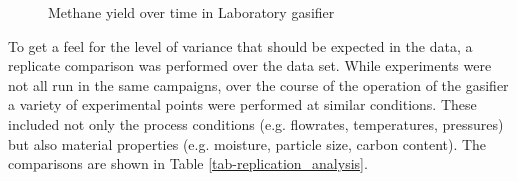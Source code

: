 \documentclass[11pt,twocolumn]{article}
\begin{document}
\begin{figure}[hp]


\caption{Methane yield over time in Laboratory gasifier}
\label{fig-Lab-CH4-dates}
\end{figure}




To get a feel for the level of variance that should be expected in the data, a replicate comparison was performed over the data set.  While experiments were not all run in the same campaigns, over the course of the operation of the gasifier a variety of experimental points were performed at similar conditions.  These included not only the process conditions (e.g. flowrates, temperatures, pressures) but also material properties (e.g. moisture, particle size, carbon content).  The comparisons are shown in Table \ref{tab-replication_analysis}.
\end{document}
